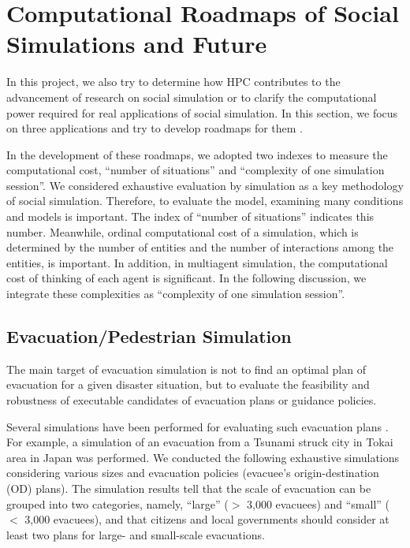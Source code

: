 \section{Computational Roadmaps of Social Simulations and Future}
\label{sec:Computational Roadmaps of Social Simulations}

In this project, we also try 
to determine how HPC contributes
to the advancement of research on social simulation or
to clarify the computational power required
for real applications of social simulation.
In this section, we focus on three applications and try
to develop roadmaps for them
\cite{Noda2018a}.

In the development of these roadmaps, 
we adopted two indexes to measure the computational cost,
``number of situations'' and ``complexity of one simulation session''.
We considered exhaustive evaluation by simulation as 
a key methodology of social simulation.
Therefore, to evaluate the model,
examining many conditions and models is important.
The index of ``number of situations'' indicates this number.
Meanwhile,
ordinal computational cost of a simulation,
which is determined by the number of entities and the number
of interactions among the entities,
is important.
In addition, in multiagent simulation,
the computational cost of thinking of each agent is significant.
In the following discussion, we integrate these complexities
as ``complexity of one simulation session''.

\subsection{Evacuation/Pedestrian Simulation}

The main target of evacuation simulation is not
to find an optimal plan of evacuation for a given disaster situation,
but to evaluate the feasibility and robustness of executable candidates
of evacuation plans or guidance policies.

Several simulations have been performed for 
evaluating such evacuation plans
\cite{Noda2009x}\cite{Noda2010p}\cite{Noda2010y}\cite{Yamashita2014}.
For example, a simulation of an evacuation from
a Tsunami struck city in Tokai area in Japan was performed.
We conducted the following exhaustive simulations considering various sizes and evacuation
policies (evacuee's origin-destination (OD) plans).
The simulation results tell that
the scale of evacuation can be grouped into two categories, namely,
``large'' ($>$ 3,000 evacuees) and
``small'' ($<$ 3,000 evacuees),
and that citizens and local governments should consider at least 
two plans for large- and small-scale evacuations.

